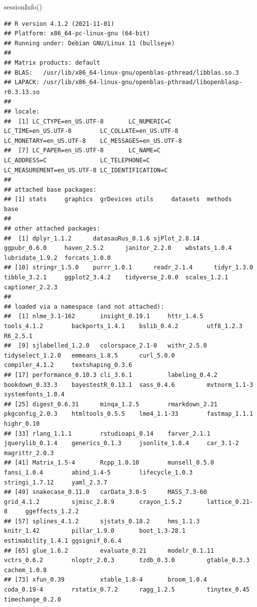 \documentclass[
  12pt,
  oneside]{book}
\newenvironment{Shaded}{\begin{snugshade}}{\end{snugshade}}
\newcommand{\FunctionTok}[1]{\textcolor[rgb]{0.00,0.00,0.00}{#1}}
\newcommand{\NormalTok}[1]{#1}
\theoremstyle{definition}
\theoremstyle{definition}
\theoremstyle{definition}
\theoremstyle{definition}
\theoremstyle{remark}
\begin{document}
\begin{Shaded}
\begin{Highlighting}[]
\FunctionTok{sessionInfo}\NormalTok{()}
\end{Highlighting}
\end{Shaded}

\begin{verbatim}
## R version 4.1.2 (2021-11-01)
## Platform: x86_64-pc-linux-gnu (64-bit)
## Running under: Debian GNU/Linux 11 (bullseye)
## 
## Matrix products: default
## BLAS:   /usr/lib/x86_64-linux-gnu/openblas-pthread/libblas.so.3
## LAPACK: /usr/lib/x86_64-linux-gnu/openblas-pthread/libopenblasp-r0.3.13.so
## 
## locale:
##  [1] LC_CTYPE=en_US.UTF-8       LC_NUMERIC=C               LC_TIME=en_US.UTF-8        LC_COLLATE=en_US.UTF-8     LC_MONETARY=en_US.UTF-8    LC_MESSAGES=en_US.UTF-8   
##  [7] LC_PAPER=en_US.UTF-8       LC_NAME=C                  LC_ADDRESS=C               LC_TELEPHONE=C             LC_MEASUREMENT=en_US.UTF-8 LC_IDENTIFICATION=C       
## 
## attached base packages:
## [1] stats     graphics  grDevices utils     datasets  methods   base     
## 
## other attached packages:
##  [1] dplyr_1.1.2      datasauRus_0.1.6 sjPlot_2.8.14    ggpubr_0.6.0     haven_2.5.2      janitor_2.2.0    wbstats_1.0.4    lubridate_1.9.2  forcats_1.0.0   
## [10] stringr_1.5.0    purrr_1.0.1      readr_2.1.4      tidyr_1.3.0      tibble_3.2.1     ggplot2_3.4.2    tidyverse_2.0.0  scales_1.2.1     captioner_2.2.3 
## 
## loaded via a namespace (and not attached):
##  [1] nlme_3.1-162       insight_0.19.1     httr_1.4.5         tools_4.1.2        backports_1.4.1    bslib_0.4.2        utf8_1.2.3         R6_2.5.1          
##  [9] sjlabelled_1.2.0   colorspace_2.1-0   withr_2.5.0        tidyselect_1.2.0   emmeans_1.8.5      curl_5.0.0         compiler_4.1.2     textshaping_0.3.6 
## [17] performance_0.10.3 cli_3.6.1          labeling_0.4.2     bookdown_0.33.3    bayestestR_0.13.1  sass_0.4.6         mvtnorm_1.1-3      systemfonts_1.0.4 
## [25] digest_0.6.31      minqa_1.2.5        rmarkdown_2.21     pkgconfig_2.0.3    htmltools_0.5.5    lme4_1.1-33        fastmap_1.1.1      highr_0.10        
## [33] rlang_1.1.1        rstudioapi_0.14    farver_2.1.1       jquerylib_0.1.4    generics_0.1.3     jsonlite_1.8.4     car_3.1-2          magrittr_2.0.3    
## [41] Matrix_1.5-4       Rcpp_1.0.10        munsell_0.5.0      fansi_1.0.4        abind_1.4-5        lifecycle_1.0.3    stringi_1.7.12     yaml_2.3.7        
## [49] snakecase_0.11.0   carData_3.0-5      MASS_7.3-60        grid_4.1.2         sjmisc_2.8.9       crayon_1.5.2       lattice_0.21-8     ggeffects_1.2.2   
## [57] splines_4.1.2      sjstats_0.18.2     hms_1.1.3          knitr_1.42         pillar_1.9.0       boot_1.3-28.1      estimability_1.4.1 ggsignif_0.6.4    
## [65] glue_1.6.2         evaluate_0.21      modelr_0.1.11      vctrs_0.6.2        nloptr_2.0.3       tzdb_0.3.0         gtable_0.3.3       cachem_1.0.8      
## [73] xfun_0.39          xtable_1.8-4       broom_1.0.4        coda_0.19-4        rstatix_0.7.2      ragg_1.2.5         tinytex_0.45       timechange_0.2.0
\end{verbatim}

  
\end{document}

